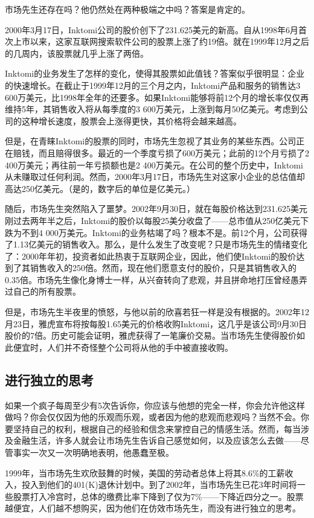 \documentclass[12pt,oneside]{book}
\begin{document}
市场先生还存在吗？他仍然处在两种极端之中吗？答案是肯定的。

2000年3月17日，Inktomi公司的股价创下了231.625美元的新高。自从1998年6月首次上市以来，这家互联网搜索软件公司的股票上涨了约19倍。就在1999年12月之后的几周内，该股票就几乎上涨了两倍。

Inktomi的业务发生了怎样的变化，使得其股票如此值钱？答案似乎很明显：企业的快速增长。在截止于1999年12月的三个月之内，Inktomi产品和服务的销售达3 600万美元，比1998年全年的还要多。如果Inktomi能够将前12个月的增长率仅仅再维持5年，其销售收入将从每季度的3 600万美元，上涨到每月50亿美元。考虑到公司的这种增长速度，股票会上涨得更快，其价格将会越来越高。

但是，在青睐Inktomi的股票的同时，市场先生忽视了其业务的某些东西。公司正在赔钱，而且赔得很多。最近的一个季度亏损了600万美元；此前的12个月亏损了2 400万美元；再往前一年亏损额也是2 400万美元。在公司的整个历史中，Inktomi从未赚取过任何利润。然而，2000年3月17日，市场先生对这家小企业的总估值却高达250亿美元。（是的，数字后的单位是亿美元。）

随后，市场先生突然陷入了噩梦。2002年9月30日，就在每股价格达到231.625美元刚过去两年半之后，Inktomi的股价以每股25美分收盘了——总市值从250亿美元下跌为不到4 000万美元。Inktomi的业务枯竭了吗？根本不是。前12个月，公司获得了1.13亿美元的销售收入。那么，是什么发生了改变呢？只是市场先生的情绪变化了：2000年年初，投资者如此热衷于互联网企业，因此，他们使Inktomi的股价达到了其销售收入的250倍。然而，现在他们愿意支付的股价，只是其销售收入的0.35倍。市场先生像化身博士一样，从兴奋转向了悲观，并且拼命地打压曾经愚弄过自己的所有股票。

但是，市场先生半夜里的愤怒，与他以前的欣喜若狂一样是没有根据的。2002年12月23日，雅虎宣布将按每股1.65美元的价格收购Inktomi，这几乎是该公司9月30日股价的7倍。历史可能会证明，雅虎获得了一笔廉价交易。当市场先生使得股价如此便宜时，人们并不奇怪整个公司将从他的手中被直接收购。

\subsection{进行独立的思考}
如果一个疯子每周至少有5次告诉你，你应该与他想的完全一样，你会允许他这样做吗？你会仅仅因为他的乐观而乐观，或者因为他的悲观而悲观吗？当然不会。你要坚持自己的权利，根据自己的经验和信念来掌控自己的情感生活。然而，每当涉及金融生活，许多人就会让市场先生告诉自己感觉如何，以及应该怎么去做——尽管事实一次又一次明确地表明，他愚蠢至极。

1999年，当市场先生欢欣鼓舞的时候，美国的劳动者总体上将其8.6\%的工薪收入，投入到他们的401(K)退休计划中。到了2002年，当市场先生已花3年时间将一些股票打入冷宫时，总体的缴费比率下降到了仅为7\%——下降近四分之一。股票越便宜，人们越不想购买，因为他们在仿效市场先生，而没有进行独立的思考。
\end{document}
